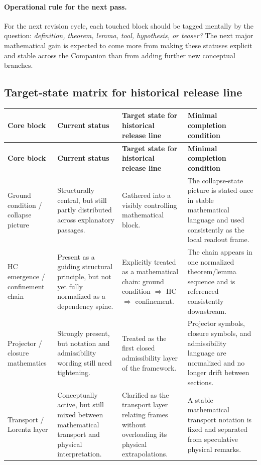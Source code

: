 \documentclass[12pt,a4paper]{article}
\DeclareRobustCommand{\QSCver}[1]{archival stage}
\renewcommand{\QSCver}[1]{historical release line}
\begin{document}
\paragraph{Operational rule for the next pass.}
For the next revision cycle, each touched block should be tagged mentally by the question: \emph{definition, theorem, lemma, tool, hypothesis, or teaser?} The next major mathematical gain is expected to come more from making these statuses explicit and stable across the Companion than from adding further new conceptual branches.


\subsection*{Target-state matrix for \QSCver{v2.27.0}}

\small\begin{longtable}{P{0.22\textwidth}P{0.17\textwidth}P{0.24\textwidth}P{0.25\textwidth}}
\toprule
\textbf{Core block} & \textbf{Current status} & \textbf{Target state for \QSCver{v2.27.0}} & \textbf{Minimal completion condition} \\
\midrule
\endfirsthead
\toprule
\textbf{Core block} & \textbf{Current status} & \textbf{Target state for \QSCver{v2.27.0}} & \textbf{Minimal completion condition} \\
\midrule
\endhead
Ground condition / collapse picture & Structurally central, but still partly distributed across explanatory passages. & Gathered into a visibly controlling mathematical block. & The collapse-state picture is stated once in stable mathematical language and used consistently as the local readout frame. \\

HC emergence / confinement chain & Present as a guiding structural principle, but not yet fully normalized as a dependency spine. & Explicitly treated as a mathematical chain: ground condition $\Rightarrow$ HC $\Rightarrow$ confinement. & The chain appears in one normalized theorem/lemma sequence and is referenced consistently downstream. \\

Projector / closure mathematics & Strongly present, but notation and admissibility wording still need tightening. & Treated as the first closed admissibility layer of the framework. & Projector symbols, closure symbols, and admissibility language are normalized and no longer drift between sections. \\

Transport / Lorentz layer & Conceptually active, but still mixed between mathematical transport and physical interpretation. & Clarified as the transport layer relating frames without overloading its physical extrapolations. & A stable mathematical transport notation is fixed and separated from speculative physical remarks. \\


\end{longtable}
\end{document}
